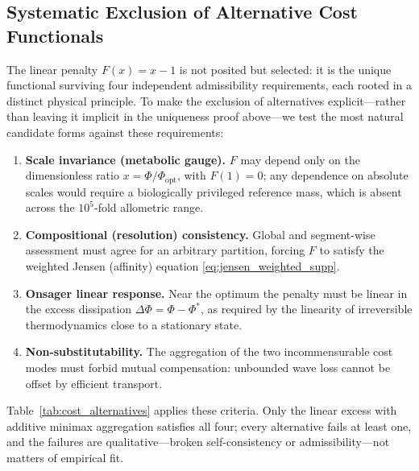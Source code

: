 \documentclass[11pt,a4paper]{article}
\theoremstyle{remark}
\begin{document}
\subsection{Systematic Exclusion of Alternative Cost Functionals}
\label{sec:S7_alternatives}

The linear penalty $F(x)=x-1$ is not posited but selected: it is the
unique functional surviving four independent admissibility requirements, each
rooted in a distinct physical principle. To make the exclusion of alternatives
explicit---rather than leaving it implicit in the uniqueness proof above---we
test the most natural candidate forms against these requirements:
\begin{enumerate}
  \item
\textbf{Scale invariance (metabolic gauge).} $F$ may depend only on the
dimensionless ratio $x=\Phi/\Phi_{\mathrm{opt}}$, with $F(1)=0$; any dependence
on absolute scales would require a biologically privileged reference mass, which
is absent across the $10^{5}$-fold allometric range.
  \item
\textbf{Compositional (resolution) consistency.} Global and segment-wise
assessment must agree for an arbitrary partition, forcing $F$ to satisfy the
weighted Jensen (affinity) equation \eqref{eq:jensen_weighted_supp}.
  \item
\textbf{Onsager linear response.} Near the optimum the penalty must be linear in
the excess dissipation $\Delta\Phi=\Phi-\Phi^{*}$, as required by the linearity
of irreversible thermodynamics close to a stationary state.
  \item
\textbf{Non-substitutability.} The aggregation of the two incommensurable cost
modes must forbid mutual compensation: unbounded wave loss cannot be offset by
efficient transport.
\end{enumerate}
Table~\ref{tab:cost_alternatives} applies these criteria. Only the linear excess
with additive minimax aggregation satisfies all four; every alternative fails at
least one, and the failures are qualitative---broken self-consistency or
admissibility---not matters of empirical fit.
\end{document}
